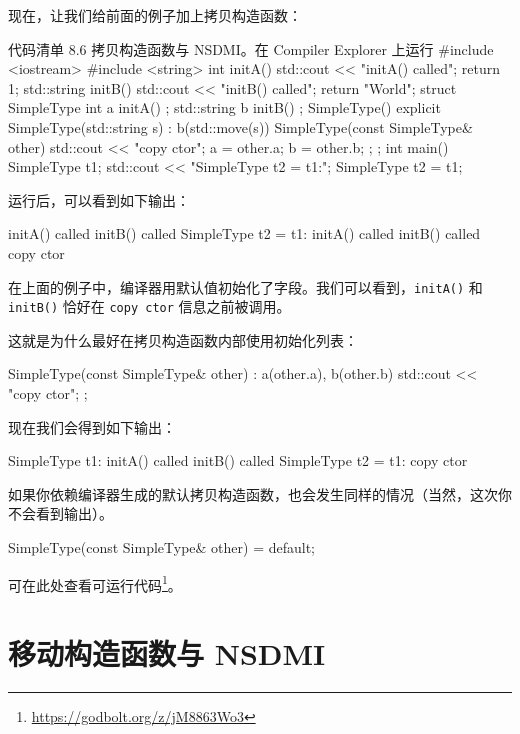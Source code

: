 现在，让我们给前面的例子加上拷贝构造函数：

\begin{codeboxt}[cpp]{代码清单 8.6 拷贝构造函数与 NSDMI。在 Compiler Explorer 上运行}
#include <iostream>
#include <string>
int initA() {
    std::cout << "initA() called\n";
    return 1;
}
std::string initB() {
    std::cout << "initB() called\n";
    return "World";
}
struct SimpleType {
    int a { initA() };
    std::string b { initB() };
    SimpleType() { }
    explicit SimpleType(std::string s) : b(std::move(s)) { }
    SimpleType(const SimpleType& other) {
        std::cout << "copy ctor\n";
        a = other.a;
        b = other.b;
    };
};
int main() {
    SimpleType t1;
    std::cout << "SimpleType t2 = t1:\n";
    SimpleType t2 = t1;
}
\end{codeboxt}

运行后，可以看到如下输出：

\begin{codebox}[cpp]
initA() called
initB() called
SimpleType t2 = t1:
initA() called
initB() called
copy ctor
\end{codebox}

在上面的例子中，编译器用默认值初始化了字段。我们可以看到，\texttt{initA()} 和 \texttt{initB()} 恰好在 \texttt{copy ctor} 信息之前被调用。

这就是为什么最好在拷贝构造函数内部使用初始化列表：

\begin{codebox}[cpp]
SimpleType(const SimpleType& other) : a(other.a), b(other.b) {
    std::cout << "copy ctor\n";
};
\end{codebox}

现在我们会得到如下输出：

\begin{codebox}[cpp]
SimpleType t1:
initA() called
initB() called
SimpleType t2 = t1:
copy ctor
\end{codebox}

如果你依赖编译器生成的默认拷贝构造函数，也会发生同样的情况（当然，这次你不会看到输出）。

\begin{codebox}[cpp]
SimpleType(const SimpleType& other) = default;
\end{codebox}

可在此处查看可运行代码\footnote{\url{https://godbolt.org/z/jM8863Wo3}}。

\section{移动构造函数与 NSDMI}

